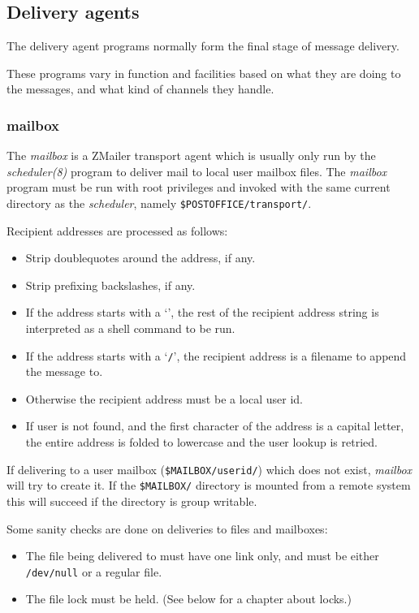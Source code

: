 \subsection{Delivery agents}

The delivery agent programs normally form the final stage of message delivery.

These programs vary in function and facilities based on what they are
doing to the messages, and what kind of channels they handle.


\subsubsection{mailbox}

The {\em mailbox\/} is a ZMailer transport agent which is usually
only run by the {\em scheduler(8)\/} program to deliver mail to
local user mailbox files. The {\em mailbox\/} program must be
run with root privileges and invoked with the same current 
directory as the {\em scheduler\/}, namely 
{\tt \$POSTOFFICE/transport/}.

Recipient addresses are processed  as follows: 

\begin{itemize}
\item Strip doublequotes around the address, if any. 
\item Strip prefixing backslashes, if any.  
\item If the address starts with a `{\tt {\verbar}}', the rest of the recipient address 
string is interpreted as  a shell command to be run. 
\item If the address starts with a `{\tt /}', the recipient address is a  filename
to append the message to. 
\item Otherwise the recipient address must be a local user id. 
\item If user is not  found,  and the first character of the address is a capital 
letter, the entire address is folded to lowercase and the user lookup is  retried.
\end{itemize}


If delivering to a user mailbox ({\tt \$MAILBOX/userid/}) which
does not exist, {\em mailbox\/} will try to create it. If the
{\tt \$MAILBOX/} directory is mounted from a remote system this
will succeed if the directory is group writable.

Some sanity checks are done on deliveries to files and mailboxes:

\begin{itemize}
\item The file being delivered to must have one link only, and must be either 
{\tt /dev/null} or a regular file.
\item The file lock must be held. (See below for a chapter about locks.)  
\end{itemize}


